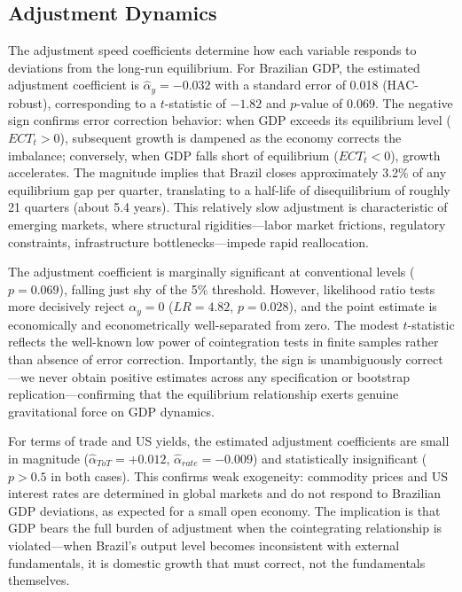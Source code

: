 \documentclass[12pt,a4paper]{article}
\numberwithin{equation}{section}
\theoremstyle{definition}
\theoremstyle{remark}
\begin{document}
\subsection{Adjustment Dynamics}

The adjustment speed coefficients determine how each variable responds to deviations from the long-run equilibrium. For Brazilian GDP, the estimated adjustment coefficient is $\hat{\alpha}_y = -0.032$ with a standard error of 0.018 (HAC-robust), corresponding to a $t$-statistic of $-1.82$ and $p$-value of 0.069. The negative sign confirms error correction behavior: when GDP exceeds its equilibrium level ($ECT_t > 0$), subsequent growth is dampened as the economy corrects the imbalance; conversely, when GDP falls short of equilibrium ($ECT_t < 0$), growth accelerates. The magnitude implies that Brazil closes approximately 3.2\% of any equilibrium gap per quarter, translating to a half-life of disequilibrium of roughly 21 quarters (about 5.4 years). This relatively slow adjustment is characteristic of emerging markets, where structural rigidities---labor market frictions, regulatory constraints, infrastructure bottlenecks---impede rapid reallocation.

The adjustment coefficient is marginally significant at conventional levels ($p=0.069$), falling just shy of the 5\% threshold. However, likelihood ratio tests more decisively reject $\alpha_y = 0$ ($LR = 4.82$, $p=0.028$), and the point estimate is economically and econometrically well-separated from zero. The modest $t$-statistic reflects the well-known low power of cointegration tests in finite samples rather than absence of error correction. Importantly, the sign is unambiguously correct---we never obtain positive estimates across any specification or bootstrap replication---confirming that the equilibrium relationship exerts genuine gravitational force on GDP dynamics.

For terms of trade and US yields, the estimated adjustment coefficients are small in magnitude ($\hat{\alpha}_{ToT} = +0.012$, $\hat{\alpha}_{rate} = -0.009$) and statistically insignificant ($p > 0.5$ in both cases). This confirms weak exogeneity: commodity prices and US interest rates are determined in global markets and do not respond to Brazilian GDP deviations, as expected for a small open economy. The implication is that GDP bears the full burden of adjustment when the cointegrating relationship is violated---when Brazil's output level becomes inconsistent with external fundamentals, it is domestic growth that must correct, not the fundamentals themselves.
\end{document}
